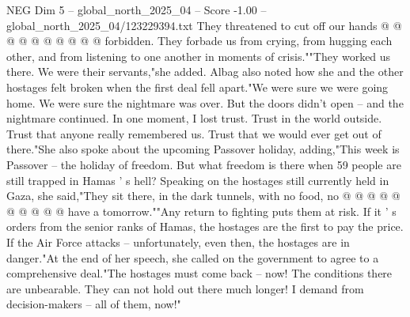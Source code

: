 \begin{textsample}{NEG Dim 5 – global\_north\_2025\_04 – Score -1.00 – global\_north\_2025\_04/123229394.txt}
They threatened to cut off our hands @ @ @ @ @ @ @ @ @ @ forbidden.
They forbade us from crying, from hugging each other, and from listening to one another in moments of crisis.""They worked us there.
We were their servants,"she added.
Albag also noted how she and the other hostages felt broken when the first deal fell apart."We were sure we were going home.
We were sure the nightmare was over.
But the doors didn't open -- and the nightmare continued.
In one moment, I lost trust.
Trust in the world outside.
Trust that anyone really remembered us.
Trust that we would ever get out of there."She also spoke about the upcoming Passover holiday, adding,"This week is Passover -- the holiday of freedom.
But what freedom is there when 59 people are still trapped in Hamas ' s hell?
Speaking on the hostages still currently held in Gaza, she said,"They sit there, in the dark tunnels, with no food, no @ @ @ @ @ @ @ @ @ @ have a tomorrow.""Any return to fighting puts them at risk.
If it ' s orders from the senior ranks of Hamas, the hostages are the first to pay the price.
If the Air Force attacks -- unfortunately, even then, the hostages are in danger."At the end of her speech, she called on the government to agree to a comprehensive deal."The hostages must come back -- now!
The conditions there are unbearable.
They can not hold out there much longer!
I demand from decision-makers -- all of them, now!"

\end{textsample}
